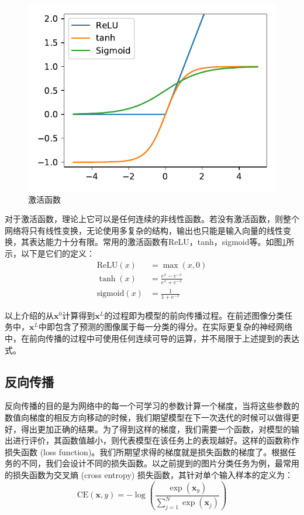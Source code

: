 \begin{figure}[]
    \centering
    \includegraphics{figure/act.pdf}
    \caption{激活函数}
    \label{act-func}
\end{figure}

对于激活函数，理论上它可以是任何连续的非线性函数。若没有激活函数，则整个网络将只有线性变换，无论使用多复杂的结构，输出也只能是输入向量的线性变换，其表达能力十分有限。常用的激活函数有ReLU，tanh，sigmoid等。如图\ref{act-func}所示，以下是它们的定义：
\begin{align}
    \mathrm{ReLU}\left(x\right)&=\max{\left(x,0\right)}\\
    \tanh{\left(x\right)}&=\frac{e^x-e^{-x}}{e^x+e^{-x}}\\
    \mathrm{sigmoid}\left(x\right)&=\frac{1}{1+e^{-x}}
\end{align}

以上介绍的从$\bm{x}^0$计算得到$\bm{x}^L$的过程即为模型的前向传播过程。在前述图像分类任务中，$\bm{x}^L$中即包含了预测的图像属于每一分类的得分。在实际更复杂的神经网络中，在前向传播的过程中可使用任何连续可导的运算，并不局限于上述提到的表达式。

\subsection{反向传播}

反向传播的目的是为网络中的每一个可学习的参数计算一个梯度，当将这些参数的数值向梯度的相反方向移动的时候，我们期望模型在下一次迭代的时候可以做得更好，得出更加正确的结果。为了得到这样的梯度，我们需要一个函数，对模型的输出进行评价，其函数值越小，则代表模型在该任务上的表现越好。这样的函数称作损失函数 (loss function)。我们所期望求得的梯度就是损失函数的梯度了。根据任务的不同，我们会设计不同的损失函数。以之前提到的图片分类任务为例，最常用的损失函数为交叉熵 (cross entropy) 损失函数，其针对单个输入样本的定义为：
\begin{equation}
    \mathrm{CE}\left(\bm{x},y\right)=-\log{\left(\frac{\exp{\left(\bm{x}_y\right)}}{\sum_{j=1}^{N}\exp{\left(\bm{x}_j\right)}}\right)}
\end{equation}

